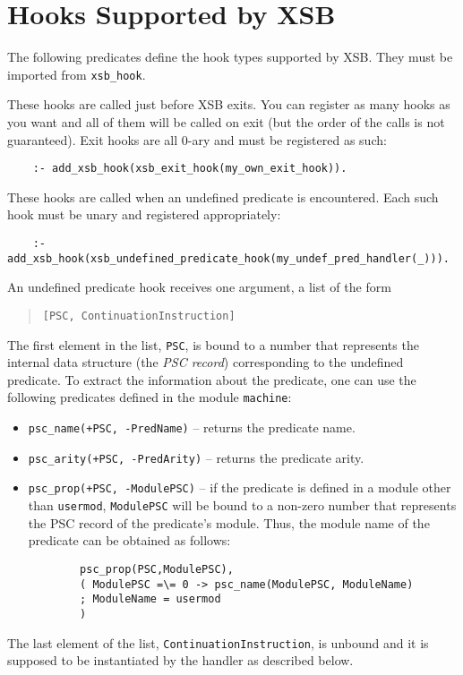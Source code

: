 \section{Hooks Supported by XSB}

The following predicates define the hook types supported by XSB. They must
be imported from {\tt xsb\_hook}.

\begin{description}
 

These hooks are called just before XSB exits. You can register as many
hooks as you want and all of them will be called on exit (but the order of
the calls is not guaranteed). Exit hooks are all 0-ary and must be registered
as such:
\begin{verbatim}
    :- add_xsb_hook(xsb_exit_hook(my_own_exit_hook)).
\end{verbatim}


These hooks are called when an undefined predicate is encountered.
Each such hook must be unary and registered appropriately:
\begin{verbatim}
    :- add_xsb_hook(xsb_undefined_predicate_hook(my_undef_pred_handler(_))).
\end{verbatim}
An undefined predicate hook receives one argument, a list of the form
\begin{quote}
  {\tt [PSC, ContinuationInstruction]} 
\end{quote}
The first element in the list, {\tt PSC}, is bound to a number that
represents the internal data structure (the \emph{PSC record})
corresponding to the undefined predicate. To extract the information about
the predicate, one can use the following predicates defined in the module
{\tt machine}:
\begin{itemize}
  \item  {\tt psc\_name(+PSC, -PredName)} -- returns the predicate name.
  \item  {\tt psc\_arity(+PSC, -PredArity)} -- returns the predicate arity.
  \item  {\tt psc\_prop(+PSC, -ModulePSC)} -- if the predicate is defined in
    a module other than {\tt usermod}, {\tt ModulePSC} will be bound to a
    non-zero number that represents the PSC record of the predicate's
    module. Thus, the module name of the predicate can be obtained as follows:
    \begin{verbatim}
        psc_prop(PSC,ModulePSC),
        ( ModulePSC =\= 0 -> psc_name(ModulePSC, ModuleName)
        ; ModuleName = usermod
        )
    \end{verbatim}
\end{itemize}
The last element of the list, {\tt ContinuationInstruction}, is unbound and
it is supposed to be instantiated by the handler as described below.


\end{description}
